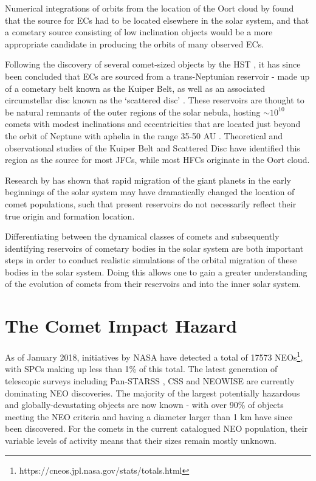 Numerical integrations of orbits from the location of the Oort cloud by \cite{1988ApJ...328L..69D} found that the source for ECs had to be located elsewhere in the solar system, and that a cometary source consisting of low inclination objects would be a more appropriate candidate in producing the orbits of many observed ECs.

Following the discovery of several comet-sized objects by the HST \cite{1995ApJ...455..342C}, it has since been concluded that ECs are sourced from a trans-Neptunian reservoir - made up of a cometary belt known as the Kuiper Belt, as well as an associated circumstellar disc known as the `scattered disc' \cite{1997Sci...276.1670D}. These reservoirs are thought to be natural remnants of the outer regions of the solar nebula, hosting $\sim10^{10}$ comets with modest inclinations and eccentricities that are located just beyond the orbit of Neptune with aphelia in the range 35-50 AU \cite{1993AJ....105.1987H}. Theoretical and observational studies of the Kuiper Belt and Scattered Disc have identified this region as the source for most JFCs, while most HFCs originate in the Oort cloud.

Research by \cite{2005Natur.435..466G} has shown that rapid migration of the giant planets in the early beginnings of the solar system may have dramatically changed the location of comet populations, such that present reservoirs do not necessarily reflect their true origin and formation location.

Differentiating between the dynamical classes of comets and subsequently identifying reservoirs of cometary bodies in the solar system are both important steps in order to conduct realistic simulations of the orbital migration of these bodies in the solar system. Doing this allows one to gain a greater understanding of the evolution of comets from their reservoirs and into the inner solar system.

\section{The Comet Impact Hazard}
\label{sec:comet_impact_hazard}


As of January 2018, initiatives by NASA have detected a total of 17573 NEOs\footnote{https://cneos.jpl.nasa.gov/stats/totals.html}, with SPCs making up less than 1\% of this total. The latest generation of telescopic surveys including Pan-STARSS \cite{1538-3873-125-926-357}, CSS \cite{1998BAAS...30.1037L} and NEOWISE \cite{2011ApJ...743..156M} are currently dominating NEO discoveries. The majority of the largest potentially hazardous and globally-devastating objects are now known - with over 90\% of objects meeting the NEO criteria and having a diameter larger than 1 km have since been discovered. For the comets in the current catalogued NEO population, their variable levels of activity means that their sizes remain mostly unknown.

